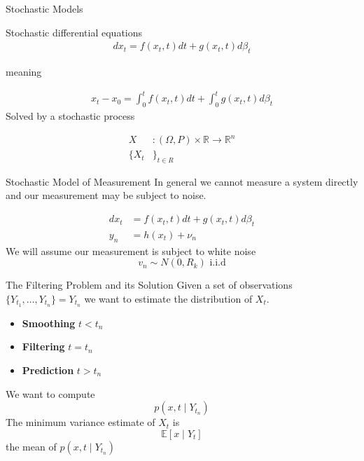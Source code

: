 \documentclass{beamer}
\newcommand{\R}{\mathbb{R}} \newcommand{\E}{\operatorname{E}}
\begin{document}
\begin{frame}{Stochastic Models}

    \pause
    Stochastic differential equations
    \begin{align}
      dx_t = f(x_t,t) dt + g(x_t,t) d\beta_t
    \end{align}

    meaning

    \begin{align}
      x_t - x_0 = \int_0^tf(x_t,t) dt + \int_0^tg(x_t,t) d\beta_t
    \end{align}
    \pause
    Solved by a stochastic process

    \begin{align}
      X &: (\Omega,P) \times \R \to \R^n \\
      \{X_t &\}_{t\in R} 
    \end{align}
  


\end{frame}

\begin{frame}{Stochastic Model of Measurement}
  In general we cannot measure a system directly and our measurement may be
  subject to noise.

  \pause

  \begin{align}
    dx_t &= f(x_t,t) dt + g(x_t,t) d\beta_t \\
    y_n  &= h(x_t) + \nu_n
  \end{align}
  \pause We will assume our measurement is subject to white noise
  \begin{equation}
    v_n \sim N(0,R_k) \text{ i.i.d}
  \end{equation}
\end{frame}

\begin{frame}{The Filtering Problem and its Solution}
  Given a set of observations $\{Y_{t_1},\dots,Y_{t_n}\} = Y_{t_n}$ we want to
  estimate the distribution of $X_t$.

  \pause
  \begin{itemize}
    \pause
  \item \textbf{Smoothing} $t < t_n$ \pause
  \item \textbf{Filtering} $t = t_n$ \pause
  \item \textbf{Prediction} $t > t_n$
  \end{itemize}

  \pause We want to compute
  \begin{equation}
    p(x,t \mid Y_{t_n})
  \end{equation}
  \pause The minimum variance estimate of $X_t$ is
  \begin{equation}
    \mathbb{E}[x \mid Y_t]
  \end{equation}
  the mean of $p(x,t \mid Y_{t_n})$
\end{frame}
\end{document}
